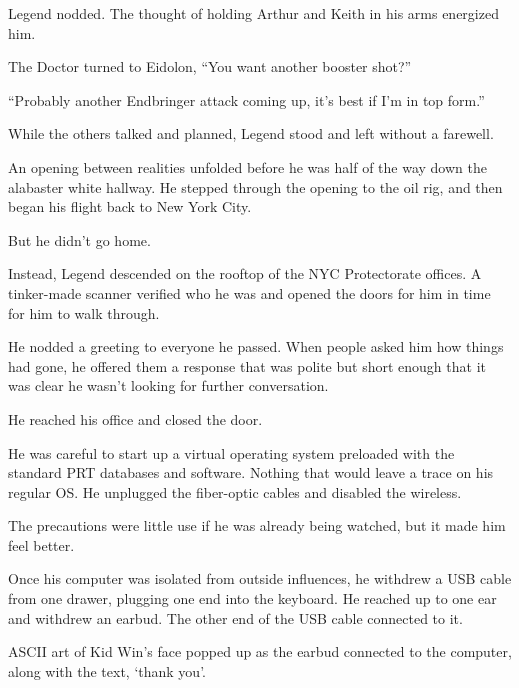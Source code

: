 Legend nodded.  The thought of holding Arthur and Keith in his arms energized him.



The Doctor turned to Eidolon, ``You want another booster shot?''



``Probably another Endbringer attack coming up, it's best if I'm in top form.''



While the others talked and planned, Legend stood and left without a farewell.



An opening between realities unfolded before he was half of the way down the alabaster white hallway.  He stepped through the opening to the oil rig, and then began his flight back to New York City.



But he didn't go home.



Instead, Legend descended on the rooftop of the NYC Protectorate offices.  A tinker-made scanner verified who he was and opened the doors for him in time for him to walk through.



He nodded a greeting to everyone he passed.  When people asked him how things had gone, he offered them a response that was polite but short enough that it was clear he wasn't looking for further conversation.



He reached his office and closed the door.



He was careful to start up a virtual operating system preloaded with the standard PRT databases and software.  Nothing that would leave a trace on his regular OS.  He unplugged the fiber-optic cables and disabled the wireless.



The precautions were little use if he was already being watched, but it made him feel better.



Once his computer was isolated from outside influences, he withdrew a USB cable from one drawer, plugging one end into the keyboard.  He reached up to one ear and withdrew an earbud.  The other end of the USB cable connected to it.



ASCII art of Kid Win's face popped up as the earbud connected to the computer, along with the text, `thank you'.



